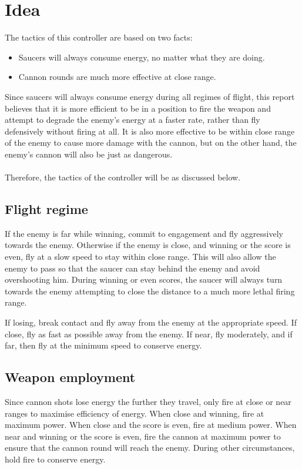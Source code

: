 \newpage

\section{Idea}

The tactics of this controller are based on two facts:

\begin{itemize}
	\item Saucers will always consume energy, no matter what they are doing.
	\item Cannon rounds are much more effective at close range.
\end{itemize}

Since saucers will always consume energy during all regimes of flight, this report believes that it is more efficient to be in a position to fire the weapon and attempt to degrade the enemy's energy at a faster rate, rather than fly defensively without firing at all. It is also more effective to be within close range of the enemy to cause more damage with the cannon, but on the other hand, the enemy's cannon will also be just as dangerous.\\
\\
Therefore, the tactics of the controller will be as discussed below.

\subsection{Flight regime}

If the enemy is far while winning, commit to engagement and fly aggressively towards the enemy. Otherwise if the enemy is close, and winning or the score is even, fly at a slow speed to stay within close range. This will also allow the enemy to pass so that the saucer can stay behind the enemy and avoid overshooting him. During winning or even scores, the saucer will always turn towards the enemy attempting to close the distance to a much more lethal firing range.

If losing, break contact and fly away from the enemy at the appropriate speed. If close, fly as fast as possible away from the enemy. If near, fly moderately, and if far, then fly at the minimum speed to conserve energy.

\subsection{Weapon employment}

Since cannon shots lose energy the further they travel, only fire at close or near ranges to maximise efficiency of energy. When close and winning, fire at maximum power. When close and the score is even, fire at medium power. When near and winning or the score is even, fire the cannon at maximum power to ensure that the cannon round will reach the enemy. During other circumstances, hold fire to conserve energy.